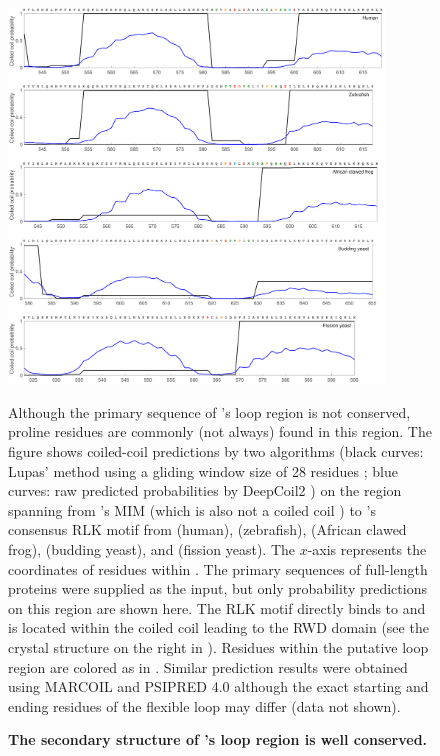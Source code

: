 \begin{figure}
    \centering
    \includegraphics[width=0.89\textwidth]{chapters/figures/MAD1_MIM-RLK_Lupas+DeepCoil2.pdf}
    \caption{\textbf{The secondary structure of 's loop region is well conserved.}}
    \noindent\justifying Although the primary sequence of 's loop region is not conserved, proline residues are commonly (not always) found in this region. The figure shows coiled-coil predictions by two algorithms (black curves: Lupas' method using a gliding window size of 28 residues \cite{LupasCOILS}; blue curves: raw predicted probabilities by DeepCoil2 \cite{DeepCoil}) on the region spanning from 's MIM (which is also not a coiled coil \cite{Structure1GO4}) to 's consensus RLK motif from  (human),  (zebrafish),  (African clawed frog),  (budding yeast), and  (fission yeast). The $x$-axis represents the coordinates of residues within . The primary sequences of full-length  proteins were supplied as the input, but only probability predictions on this region are shown here. The RLK motif directly binds to  \cite{Ji2017eLife, BUB1CD1-MAD1CStructure} and is located within the coiled coil leading to the RWD domain (see the crystal structure on the right in ). Residues within the putative loop region are colored as in . Similar prediction results were obtained using MARCOIL \cite{MARCOIL} and PSIPRED 4.0 \cite{PSIPREDOriginal, PSIPREDPlatform} although the exact starting and ending residues of the flexible loop may differ (data not shown).
    \label{MAD1_MIM-RLK_Lupas+DeepCoil2}
\end{figure}

